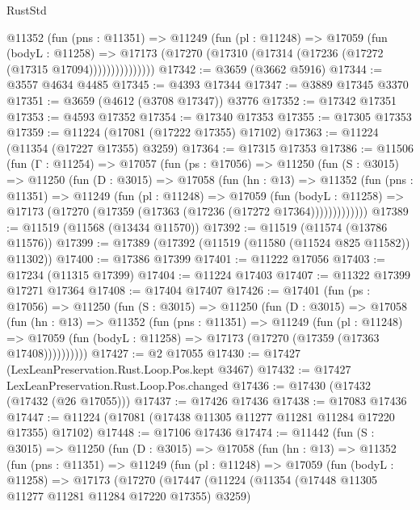 \begin{lexlean}{RustStd}
\begin{coremodule}
              @11352
                (fun (pns : @11351) =>
                @11249
                  (fun (pl : @11248) =>
                  @17059
                    (fun (bodyL : @11258) =>
                    @17173 (@17270 (@17310 (@17314 (@17236 (@17272 (@17315 @17094)))))))))))))))
@17342 := @3659 (@3662 @5916)
@17344 := @3557 @4634 @4485
@17345 := @4393 @17344
@17347 := @3889 @17345 @3370
@17351 := @3659 (@4612 (@3708 @17347)) @3776
@17352 := @17342 @17351
@17353 := @4593 @17352
@17354 := @17340 @17353
@17355 := @17305 @17353
@17359 := @11224 (@17081 (@17222 @17355) @17102)
@17363 := @11224 (@11354 (@17227 @17355) @3259)
@17364 := @17315 @17353
@17386 := @11506
    (fun (Γ : @11254) =>
    @17057
      (fun (ps : @17056) =>
      @11250
        (fun (S : @3015) =>
        @11250
          (fun (D : @3015) =>
          @17058
            (fun (hn : @13) =>
            @11352
              (fun (pns : @11351) =>
              @11249
                (fun (pl : @11248) =>
                @17059
                  (fun (bodyL : @11258) =>
                  @17173 (@17270 (@17359 (@17363 (@17236 (@17272 @17364)))))))))))))
@17389 := @11519 (@11568 (@13434 @11570))
@17392 := @11519 (@11574 (@13786 @11576))
@17399 := @17389 (@17392 (@11519 (@11580 (@11524 @825 @11582)) @11302))
@17400 := @17386 @17399
@17401 := @11222 @17056
@17403 := @17234 (@11315 @17399)
@17404 := @11224 @17403
@17407 := @11322 @17399 @17271 @17364
@17408 := @17404 @17407
@17426 := @17401
    (fun (ps : @17056) =>
    @11250
      (fun (S : @3015) =>
      @11250
        (fun (D : @3015) =>
        @17058
          (fun (hn : @13) =>
          @11352
            (fun (pns : @11351) =>
            @11249
              (fun (pl : @11248) =>
              @17059 (fun (bodyL : @11258) => @17173 (@17270 (@17359 (@17363 @17408))))))))))
@17427 := @2 @17055
@17430 := @17427 (LexLeanPreservation.Rust.Loop.Pos.kept @3467)
@17432 := @17427 LexLeanPreservation.Rust.Loop.Pos.changed
@17436 := @17430 (@17432 (@17432 (@26 @17055)))
@17437 := @17426 @17436
@17438 := @17083 @17436
@17447 := @11224 (@17081 (@17438 @11305 @11277 @11281 @11284 @17220 @17355) @17102)
@17448 := @17106 @17436
@17474 := @11442
    (fun (S : @3015) =>
    @11250
      (fun (D : @3015) =>
      @17058
        (fun (hn : @13) =>
        @11352
          (fun (pns : @11351) =>
          @11249
            (fun (pl : @11248) =>
            @17059
              (fun (bodyL : @11258) =>
              @17173
                (@17270
                  (@17447
                    (@11224
                      (@11354 (@17448 @11305 @11277 @11281 @11284 @17220 @17355) @3259)

\end{coremodule}
\end{lexlean}
